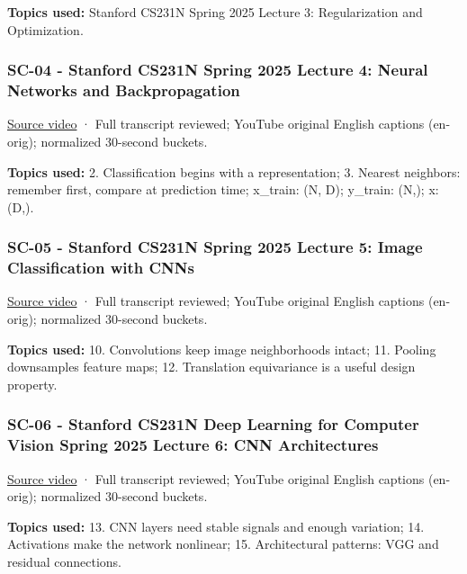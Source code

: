 \textbf{Topics used:} Stanford CS231N \textbar{} Spring 2025 \textbar{} Lecture 3: Regularization and Optimization.

\subsubsection{SC-04 - Stanford CS231N Spring 2025 Lecture 4: Neural Networks and Backpropagation}\label{04-visual-computing-ii-ch036-sc-04---stanford-cs231n-spring-2025-lecture-4-neural-networks-and-backpropagation}

\href{https://www.youtube.com/watch?v=25zD5qJHYsk}{Source video} · Full transcript reviewed; YouTube original English captions (en-orig); normalized 30-second buckets.

\textbf{Topics used:} 2. Classification begins with a representation; 3. Nearest neighbors: remember first, compare at prediction time; x\_train: (N, D); y\_train: (N,); x: (D,).

\subsubsection{SC-05 - Stanford CS231N Spring 2025 Lecture 5: Image Classification with CNNs}\label{04-visual-computing-ii-ch036-sc-05---stanford-cs231n-spring-2025-lecture-5-image-classification-with-cnns}

\href{https://www.youtube.com/watch?v=f3g1zGdxptI}{Source video} · Full transcript reviewed; YouTube original English captions (en-orig); normalized 30-second buckets.

\textbf{Topics used:} 10. Convolutions keep image neighborhoods intact; 11. Pooling downsamples feature maps; 12. Translation equivariance is a useful design property.

\subsubsection{SC-06 - Stanford CS231N Deep Learning for Computer Vision Spring 2025 Lecture 6: CNN Architectures}\label{04-visual-computing-ii-ch036-sc-06---stanford-cs231n-deep-learning-for-computer-vision-spring-2025-lecture-6-cnn-architectures}

\href{https://www.youtube.com/watch?v=aVJy4O5TOk8}{Source video} · Full transcript reviewed; YouTube original English captions (en-orig); normalized 30-second buckets.

\textbf{Topics used:} 13. CNN layers need stable signals and enough variation; 14. Activations make the network nonlinear; 15. Architectural patterns: VGG and residual connections.

